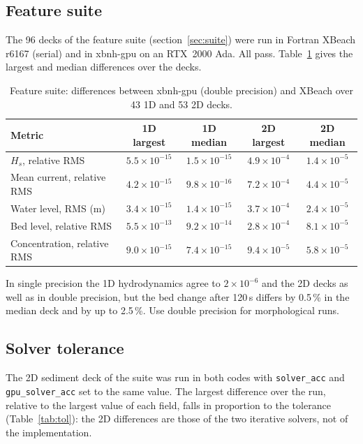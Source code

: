 \documentclass[11pt,a4paper]{article}
\newcommand{\code}[1]{\texttt{#1}}
\begin{document}
\subsection{Feature suite}
The 96 decks of the feature suite (section~\ref{sec:suite}) were run in Fortran XBeach r6167 (serial) and in
xbnh-gpu on an RTX~2000 Ada. All pass. Table~\ref{tab:suite} gives the largest and median differences over
the decks.

\begin{table}[h]\centering\small
\caption{Feature suite: differences between xbnh-gpu (double precision) and XBeach over 43 1D and 53 2D decks.}\label{tab:suite}
\begin{tabular}{lcccc}
\toprule
Metric & 1D largest & 1D median & 2D largest & 2D median \\
\midrule
$H_s$, relative RMS & $5.5\times10^{-15}$ & $1.5\times10^{-15}$ & $4.9\times10^{-4}$ & $1.4\times10^{-5}$ \\
Mean current, relative RMS & $4.2\times10^{-15}$ & $9.8\times10^{-16}$ & $7.2\times10^{-4}$ & $4.4\times10^{-5}$ \\
Water level, RMS (m) & $3.4\times10^{-15}$ & $1.4\times10^{-15}$ & $3.7\times10^{-4}$ & $2.4\times10^{-5}$ \\
Bed level, relative RMS & $5.5\times10^{-13}$ & $9.2\times10^{-14}$ & $2.8\times10^{-4}$ & $8.1\times10^{-5}$ \\
Concentration, relative RMS & $9.0\times10^{-15}$ & $7.4\times10^{-15}$ & $9.4\times10^{-5}$ & $5.8\times10^{-5}$ \\
\bottomrule
\end{tabular}
\end{table}

In single precision the 1D hydrodynamics agree to $2\times10^{-6}$ and the 2D decks as well as in double
precision, but the bed change after 120\,s differs by 0.5\,\% in the median deck and by up to 2.5\,\%. Use
double precision for morphological runs.

\subsection{Solver tolerance}
The 2D sediment deck of the suite was run in both codes with \code{solver\_acc} and \code{gpu\_solver\_acc}
set to the same value. The largest difference over the run, relative to the largest value of each field,
falls in proportion to the tolerance (Table~\ref{tab:tol}): the 2D differences are those of the two
iterative solvers, not of the implementation.
\end{document}
